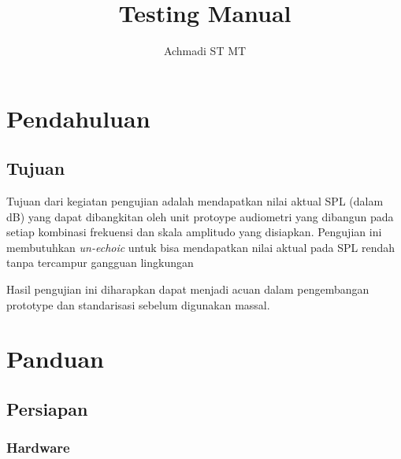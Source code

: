 \documentclass[12pt,]{article}
\title{\Large \bf
	Testing Manual\\
}
\author{Achmadi ST MT}
\date{}
\newcommand{\ShowOsVersion}{
	\immediate\write18{\unexpanded{foo=`uname -sro` && echo "${foo}" > tmp.tex}}
	\immediate\write18{rm tmp.tex}
}
\newcommand{\ShowTexVersion}{
	\immediate\write18{\unexpanded{foo=`pdflatex -version | head -n1 | cut -d' ' -f1,2` && echo "${foo}" > tmp.tex}}
	\immediate\write18{rm tmp.tex}
}
\begin{document}
	\maketitle
	\thispagestyle{empty}
	
	\vspace*{300pt}
	
	
	
	\newpage
	\tableofcontents
	
	
	\newpage
	\section{Pendahuluan}
	
	\subsection{Tujuan}
	
	Tujuan dari kegiatan pengujian adalah mendapatkan nilai aktual SPL (dalam dB) yang dapat dibangkitan
	oleh unit protoype audiometri yang dibangun pada setiap kombinasi frekuensi dan skala amplitudo yang disiapkan.
	Pengujian ini membutuhkan \textit{un-echoic} untuk bisa mendapatkan nilai aktual pada SPL rendah tanpa tercampur gangguan lingkungan
	
	Hasil pengujian ini diharapkan dapat menjadi acuan dalam pengembangan prototype dan standarisasi sebelum digunakan massal.
	
	\newpage
	\section{Panduan}
	
	\subsection{Persiapan}
	
	\subsubsection{Hardware}
	
\end{document}
